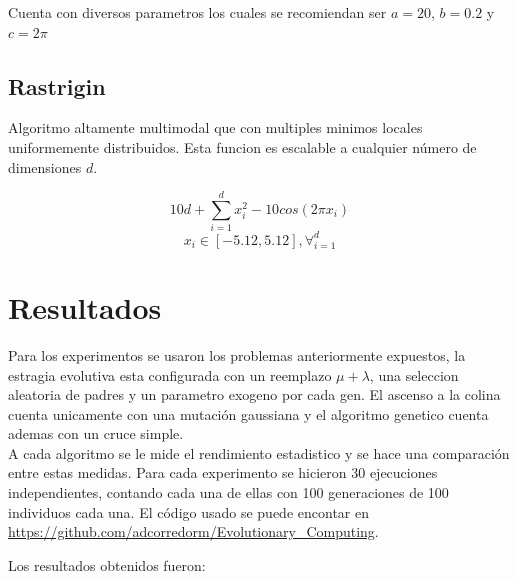 \documentclass[twocolumn]{IEEEtran}
\begin{document}
Cuenta con diversos parametros los cuales se recomiendan ser $a=20$, $b=0.2$ y $c=2\pi$

\subsection{Rastrigin}

Algoritmo altamente multimodal que con multiples minimos locales uniformemente distribuidos.
Esta funcion es escalable a cualquier número de dimensiones $d$.

$$10d + \sum_{i=1}^d{x_i^2 - 10cos(2\pi x_i)}$$
$$ x_i \in [-5.12, 5.12], \forall_{i=1}^d$$

\section{Resultados}

Para los experimentos se usaron los problemas anteriormente expuestos,
la estragia evolutiva esta configurada con un reemplazo $\mu + \lambda$, una seleccion aleatoria 
de padres y un parametro exogeno por cada gen.
El ascenso a la colina cuenta unicamente con una mutación gaussiana y el algoritmo genetico 
cuenta ademas con un cruce simple. \\

A cada algoritmo se le mide el rendimiento estadistico y se hace una comparación entre estas medidas.
Para cada experimento se hicieron 30 ejecuciones independientes, 
contando cada una de ellas con 100 generaciones de 100 individuos cada una.
El código usado se puede encontar en \url{https://github.com/adcorredorm/Evolutionary_Computing}.

Los resultados obtenidos fueron:
\end{document}
